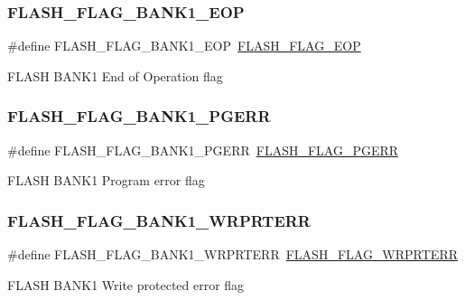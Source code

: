 \subsubsection{\texorpdfstring{FLASH\_FLAG\_BANK1\_EOP}{FLASH\_FLAG\_BANK1\_EOP}}
{\footnotesize\ttfamily \#define F\+L\+A\+S\+H\+\_\+\+F\+L\+A\+G\+\_\+\+B\+A\+N\+K1\+\_\+\+E\+OP~\mbox{\hyperlink{group___f_l_a_s_h___flags_gaf043ba4d8f837350bfc7754a99fae5a9}{F\+L\+A\+S\+H\+\_\+\+F\+L\+A\+G\+\_\+\+E\+OP}}}

F\+L\+A\+SH B\+A\+N\+K1 End of Operation flag \mbox{\label{group___f_l_a_s_h___flags_gaa1056ffdd1c434a2967d5ed7c0d263be}} 
\subsubsection{\texorpdfstring{FLASH\_FLAG\_BANK1\_PGERR}{FLASH\_FLAG\_BANK1\_PGERR}}
{\footnotesize\ttfamily \#define F\+L\+A\+S\+H\+\_\+\+F\+L\+A\+G\+\_\+\+B\+A\+N\+K1\+\_\+\+P\+G\+E\+RR~\mbox{\hyperlink{group___f_l_a_s_h___flags_gae2ef62dee0a5ca01e6226746039b6f20}{F\+L\+A\+S\+H\+\_\+\+F\+L\+A\+G\+\_\+\+P\+G\+E\+RR}}}

F\+L\+A\+SH B\+A\+N\+K1 Program error flag \mbox{\label{group___f_l_a_s_h___flags_ga1646345adbcda773ef25785b1bdc4c43}} 
\subsubsection{\texorpdfstring{FLASH\_FLAG\_BANK1\_WRPRTERR}{FLASH\_FLAG\_BANK1\_WRPRTERR}}
{\footnotesize\ttfamily \#define F\+L\+A\+S\+H\+\_\+\+F\+L\+A\+G\+\_\+\+B\+A\+N\+K1\+\_\+\+W\+R\+P\+R\+T\+E\+RR~\mbox{\hyperlink{group___f_l_a_s_h___flags_ga5c59a7f07507cac38091275964d3d35d}{F\+L\+A\+S\+H\+\_\+\+F\+L\+A\+G\+\_\+\+W\+R\+P\+R\+T\+E\+RR}}}

F\+L\+A\+SH B\+A\+N\+K1 Write protected error flag \mbox{\label{group___f_l_a_s_h___flags_gad3bc368f954ad7744deda3315da2fff7}} 
